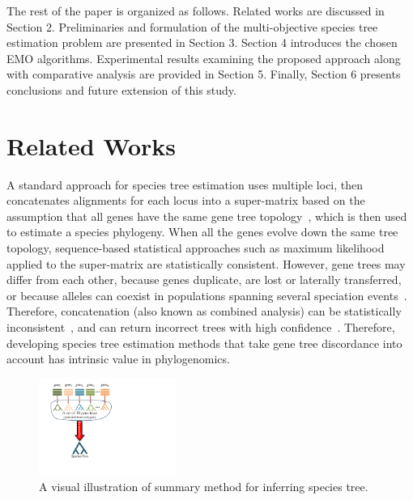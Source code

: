 The rest of the paper is organized as follows. Related works
are discussed in Section 2. Preliminaries and formulation
of the multi-objective species tree estimation problem are presented in Section 3. Section 4 introduces the chosen EMO algorithms. Experimental
results examining the proposed approach along with comparative analysis are provided in Section 5. Finally, Section 6 presents
conclusions and future extension of this study.





\section{Related Works}
A standard approach for species tree estimation uses multiple loci, then concatenates alignments for each locus
into a super-matrix based on the assumption that all genes have the same gene tree topology~\cite{huelsenbeck1996combining, de2007supermatrix}, which is then used to estimate a species phylogeny. When all the genes evolve down the same tree topology,  sequence-based statistical approaches such as maximum likelihood applied to the super-matrix are statistically consistent. 
However, gene trees may differ from each other, because genes duplicate, are lost or laterally transferred, or because alleles can coexist in populations spanning several speciation events~\cite{maddison1997gene}.
Therefore, concatenation (also known as combined analysis) can be statistically inconsistent~\cite{roch2015likelihood}, and can return incorrect trees with high confidence~\cite{kubatko-degnan-2007,edwards2007,leache-rannala,degiorgio2009}. Therefore, developing species tree estimation methods that take gene tree discordance into account has intrinsic value in phylogenomics.


\begin{figure}[!htbp]
		\centering    
		\includegraphics[width=0.4\textwidth]{Figure/summary_method}
	\caption{A visual illustration of summary method for inferring species tree.} \label{fig:summary_method}
\end{figure}

